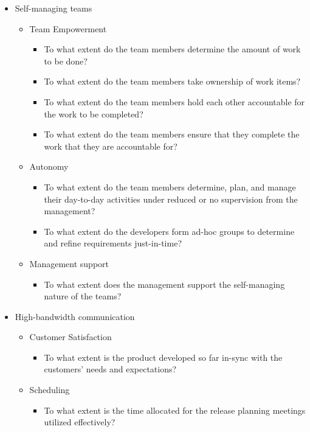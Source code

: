 \begin{itemize}
	\item Self-managing teams
		\begin{itemize}
			\item Team Empowerment
				\begin{itemize}
					\item To what extent do the team members determine the amount of work to be done? 
					\item To what extent do the team members take ownership of work items? 
					\item To what extent do the team members hold each other accountable for the work to be completed? 
					\item To what extent do the team members ensure that they complete the work that they are accountable for?
				\end{itemize}
			\item Autonomy
				\begin{itemize}
					\item To what extent do the team members determine, plan, and manage their day-to-day activities under reduced or no supervision from the management? 
					\item To what extent do the developers form ad-hoc groups to determine and refine requirements just-in-time? 
				\end{itemize}
			\item Management support
				\begin{itemize}
					\item To what extent does the management support the self-managing nature of the teams?
				\end{itemize}
		\end{itemize}
	\item High-bandwidth communication
		\begin{itemize}
			\item Customer Satisfaction
				\begin{itemize}
					\item To what extent is the product developed so far in-sync with the customers' needs and expectations?
				\end{itemize}
			\item Scheduling
				\begin{itemize}
					\item To what extent is the time allocated for the release planning meetings utilized effectively? 

\end{itemize}
\end{itemize}
\end{itemize}
